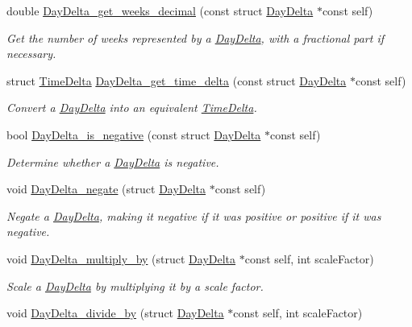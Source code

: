 \begin{DoxyCompactItemize}
double \hyperlink{day-delta_8h_a62efa797217bb961a560f07cf25d4462}{\-Day\-Delta\-\_\-get\-\_\-weeks\-\_\-decimal} (const struct \hyperlink{structDayDelta}{\-Day\-Delta} $\ast$const self)
\begin{DoxyCompactList}\small\item\em \-Get the number of weeks represented by a \hyperlink{structDayDelta}{\-Day\-Delta}, with a fractional part if necessary. \end{DoxyCompactList}\item 
struct \hyperlink{structTimeDelta}{\-Time\-Delta} \hyperlink{day-delta_8h_a62765dd1d10d3358a5b41469ef9520a6}{\-Day\-Delta\-\_\-get\-\_\-time\-\_\-delta} (const struct \hyperlink{structDayDelta}{\-Day\-Delta} $\ast$const self)
\begin{DoxyCompactList}\small\item\em \-Convert a \hyperlink{structDayDelta}{\-Day\-Delta} into an equivalent \hyperlink{structTimeDelta}{\-Time\-Delta}. \end{DoxyCompactList}\item 
bool \hyperlink{day-delta_8h_a4b104966e921d8b90ce0c1094861b9b2}{\-Day\-Delta\-\_\-is\-\_\-negative} (const struct \hyperlink{structDayDelta}{\-Day\-Delta} $\ast$const self)
\begin{DoxyCompactList}\small\item\em \-Determine whether a \hyperlink{structDayDelta}{\-Day\-Delta} is negative. \end{DoxyCompactList}\item 
void \hyperlink{day-delta_8h_a9deb74bc8d748a21449a16e658f16432}{\-Day\-Delta\-\_\-negate} (struct \hyperlink{structDayDelta}{\-Day\-Delta} $\ast$const self)
\begin{DoxyCompactList}\small\item\em \-Negate a \hyperlink{structDayDelta}{\-Day\-Delta}, making it negative if it was positive or positive if it was negative. \end{DoxyCompactList}\item 
void \hyperlink{day-delta_8h_ad41c3944938dda1471842ff64055591e}{\-Day\-Delta\-\_\-multiply\-\_\-by} (struct \hyperlink{structDayDelta}{\-Day\-Delta} $\ast$const self, int scale\-Factor)
\begin{DoxyCompactList}\small\item\em \-Scale a \hyperlink{structDayDelta}{\-Day\-Delta} by multiplying it by a scale factor. \end{DoxyCompactList}\item 
void \hyperlink{day-delta_8h_a21da0fd2d2396c2334bf15c462d82ed1}{\-Day\-Delta\-\_\-divide\-\_\-by} (struct \hyperlink{structDayDelta}{\-Day\-Delta} $\ast$const self, int scale\-Factor)

\end{DoxyCompactItemize}

